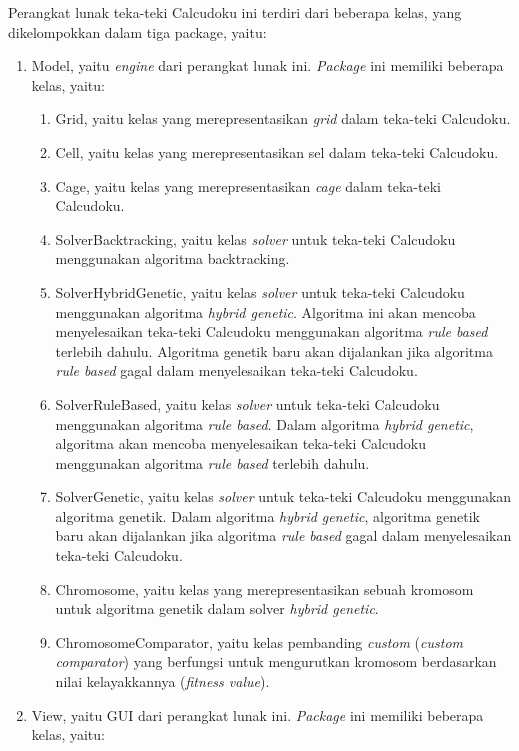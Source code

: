 Perangkat lunak teka-teki Calcudoku ini terdiri dari beberapa kelas, yang dikelompokkan dalam tiga package, yaitu:

\begin{enumerate}
\item Model, yaitu \textit{engine} dari perangkat lunak ini. \textit{Package} ini memiliki beberapa kelas, yaitu:
	\begin{enumerate}
	\item Grid, yaitu kelas yang merepresentasikan \textit{grid} dalam teka-teki Calcudoku.
	\item Cell, yaitu kelas yang merepresentasikan sel dalam teka-teki Calcudoku.
	\item Cage, yaitu kelas yang merepresentasikan \textit{cage} dalam teka-teki Calcudoku.
	\item SolverBacktracking, yaitu kelas \textit{solver} untuk teka-teki Calcudoku menggunakan algoritma backtracking.
	\item SolverHybridGenetic, yaitu kelas \textit{solver} untuk teka-teki Calcudoku menggunakan algoritma \textit{hybrid genetic}. Algoritma ini akan mencoba menyelesaikan teka-teki Calcudoku menggunakan algoritma \textit{rule based} terlebih dahulu. Algoritma genetik baru akan dijalankan jika algoritma \textit{rule based} gagal dalam menyelesaikan teka-teki Calcudoku.
	\item SolverRuleBased, yaitu kelas \textit{solver} untuk teka-teki Calcudoku menggunakan algoritma \textit{rule based}. Dalam algoritma \textit{hybrid genetic}, algoritma akan mencoba menyelesaikan teka-teki Calcudoku menggunakan algoritma \textit{rule based} terlebih dahulu.
	\item SolverGenetic, yaitu kelas \textit{solver} untuk teka-teki Calcudoku menggunakan algoritma genetik. Dalam algoritma \textit{hybrid genetic}, algoritma genetik baru akan dijalankan jika algoritma \textit{rule based} gagal dalam menyelesaikan teka-teki Calcudoku.
	\item Chromosome, yaitu kelas yang merepresentasikan sebuah kromosom untuk algoritma genetik dalam solver \textit{hybrid genetic}.
	\item ChromosomeComparator, yaitu kelas pembanding \textit{custom} (\textit{custom comparator}) yang berfungsi untuk mengurutkan kromosom berdasarkan nilai kelayakkannya (\textit{fitness value}).	
	\end{enumerate}
\item View, yaitu GUI dari perangkat lunak ini. \textit{Package} ini memiliki beberapa kelas, yaitu:

\end{enumerate}
